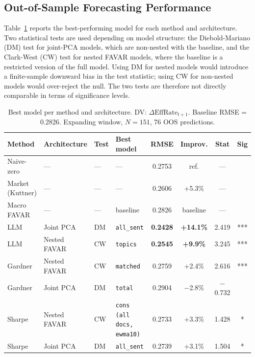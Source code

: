 
\subsection{Out-of-Sample Forecasting Performance}

Table~\ref{tab:oos_main} reports the best-performing model for each method and architecture. Two statistical tests are used depending on model structure: the Diebold-Mariano (DM) test for joint-PCA models, which are non-nested with the baseline, and the Clark-West (CW) test for nested FAVAR models, where the baseline is a restricted version of the full model. Using DM for nested models would introduce a finite-sample downward bias in the test statistic; using CW for non-nested models would over-reject the null. The two tests are therefore not directly comparable in terms of significance levels.

\begin{table}[ht]
\centering
\caption{Best model per method and architecture. DV: $\Delta\text{EffRate}_{t+1}$. Baseline RMSE = 0.2826. Expanding window, $N = 151$, 76 OOS predictions.}
\label{tab:oos_main}
\small
\begin{tabular}{llllcccc}
\toprule
Method & Architecture & Test & Best model & RMSE & Improv. & Stat & Sig \\
\midrule
Naive-zero      & —           & —  & —                      & 0.2753 & ref.   & —      &     \\
Market (Kuttner)& —           & —  & —                      & 0.2606 & +5.3\% & —      &     \\
Macro FAVAR     & —           & —  & baseline               & 0.2826 & baseline & —    &     \\
\midrule
LLM             & Joint PCA   & DM & \texttt{all\_sent}     & \textbf{0.2428} & \textbf{+14.1\%} & 2.419 & *** \\
LLM             & Nested FAVAR& CW & \texttt{topics}        & \textbf{0.2545} & \textbf{+9.9\%}  & 3.245 & *** \\
Gardner         & Nested FAVAR& CW & \texttt{matched}       & 0.2759          & +2.4\%           & 2.616 & *** \\
Gardner         & Joint PCA   & DM & \texttt{total}         & 0.2904          & $-$2.8\%         & $-$0.732 &  \\
Sharpe          & Nested FAVAR& CW & \texttt{cons (all docs, ewma10)} & 0.2733 & +3.3\%  & 1.428 & *   \\
Sharpe          & Joint PCA   & DM & \texttt{all\_sent}     & 0.2739          & +3.1\%           & 1.504 & *  \\
\bottomrule
\end{tabular}
\end{table}

